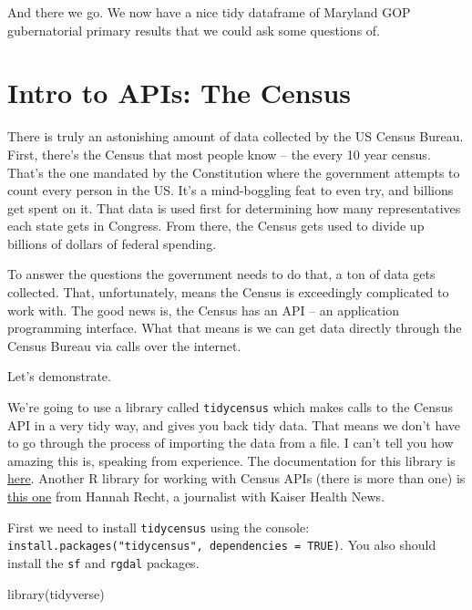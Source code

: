 \documentclass[
  letterpaper,
  DIV=11,
  numbers=noendperiod]{scrreprt}
\newenvironment{Shaded}{\begin{snugshade}}{\end{snugshade}}
\newcommand{\FunctionTok}[1]{\textcolor[rgb]{0.28,0.35,0.67}{#1}}
\newcommand{\NormalTok}[1]{\textcolor[rgb]{0.00,0.23,0.31}{#1}}
\begin{document}
And there we go. We now have a nice tidy dataframe of Maryland GOP
gubernatorial primary results that we could ask some questions of.


\hypertarget{intro-to-apis-the-census}{%
\chapter{Intro to APIs: The Census}\label{intro-to-apis-the-census}}

There is truly an astonishing amount of data collected by the US Census
Bureau. First, there's the Census that most people know -- the every 10
year census. That's the one mandated by the Constitution where the
government attempts to count every person in the US. It's a
mind-boggling feat to even try, and billions get spent on it. That data
is used first for determining how many representatives each state gets
in Congress. From there, the Census gets used to divide up billions of
dollars of federal spending.

To answer the questions the government needs to do that, a ton of data
gets collected. That, unfortunately, means the Census is exceedingly
complicated to work with. The good news is, the Census has an API -- an
application programming interface. What that means is we can get data
directly through the Census Bureau via calls over the internet.

Let's demonstrate.

We're going to use a library called \texttt{tidycensus} which makes
calls to the Census API in a very tidy way, and gives you back tidy
data. That means we don't have to go through the process of importing
the data from a file. I can't tell you how amazing this is, speaking
from experience. The documentation for this library is
\href{https://walker-data.com/tidycensus/}{here}. Another R library for
working with Census APIs (there is more than one) is
\href{https://github.com/hrecht/censusapi}{this one} from Hannah Recht,
a journalist with Kaiser Health News.

First we need to install \texttt{tidycensus} using the console:
\texttt{install.packages("tidycensus",\ dependencies\ =\ TRUE)}. You
also should install the \texttt{sf} and \texttt{rgdal} packages.

\begin{Shaded}
\begin{Highlighting}[]
\FunctionTok{library}\NormalTok{(tidyverse)}
\end{Highlighting}
\end{Shaded}
\end{document}
